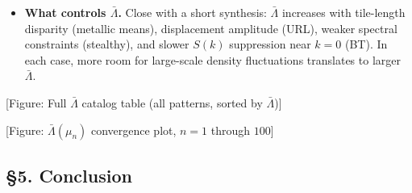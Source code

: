 \documentclass[11pt]{article}
\newcommand{\fig}[1]{{\color{figcolor}\textsf{[Figure: #1]}}}
\newcommand{\opn}[1]{{\color{notecolor}\textsf{[#1]}}}
\newcommand{\Lb}{\bar\Lambda}
\begin{document}
\begin{itemize}[leftmargin=1.5em]
        The 138 non-unimodular chains show $\Lb$ varying by
        factors of 5--15 within each $\alpha$ group: the full
        substitution rule, not just the eigenvalues, controls
        residual disorder.

        \opn{We only have good ordered structures (metallic means)
        at $\alpha = 3$. A disordered $\alpha = 3$ comparison would
        be valuable but is not in the catalog. Note as limitation.}

  \item \textbf{What controls $\Lb$.}
        Close with a short synthesis: $\Lb$ increases with
        tile-length disparity (metallic means),
        displacement amplitude (URL),
        weaker spectral constraints (stealthy), and
        slower $S(k)$ suppression near $k = 0$ (BT).
        In each case, more room for large-scale density fluctuations
        translates to larger $\Lb$.
\end{itemize}

\fig{Full $\Lb$ catalog table (all patterns, sorted by $\Lb$)}

\fig{$\Lb(\mu_n)$ convergence plot, $n = 1$ through $100$}

\subsection{\S5. Conclusion}
\end{document}
